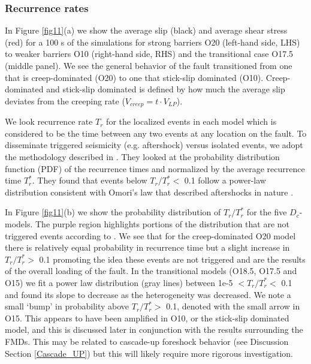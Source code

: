 \documentclass[preprint,1p, 10pt,authoryear]{elsarticle}
\begin{document}
\subsubsection{Recurrence rates}
\label{Recurrence times}
In Figure \ref{fig11}(a) we show the average slip (black) and average shear stress (red) for a 100 s of the simulations for strong barriers O20 (left-hand side, LHS) to weaker barriers O10 (right-hand side, RHS) and the transitional case O17.5 (middle panel).  We see the general behavior of the fault transitioned from one that is creep-dominated (O20) to one that stick-slip dominated (O10). Creep-dominated and stick-slip dominated is defined by how much the average slip deviates from the creeping rate ($V_{creep} = t\cdot V_{LP}$). 

We look recurrence rate $T_{r}$ for the localized events in each model which is considered to be the time between any two events at any location on the fault. To disseminate triggered  seismicity (e.g. aftershock) versus isolated events, we adopt the methodology described in \citet{Lengline2009}. They looked at the probability distribution function (PDF) of the recurrence times and normalized by the average recurrence time $T^{*}_{r}$.  They found that events below $T_{r}/T^{*}_{r} <$ 0.1 follow a power-law distribution consistent with Omori's law that described aftershocks in nature \citep[e.g.,][]{Lengline2009}. 

In Figure \ref{fig11}(b) we show the probability distribution of $T_{r}/T^{*}_{r}$ for the five $D_{c}$-models. The purple region highlights portions of the distribution that are not triggered events according to \citet{Lengline2009}. We see that for the creep-dominated O20 model there is relatively equal probability in recurrence time but a slight increase in  $T_{r}/T^{*}_{r} >$ 0.1 promoting the idea these events are not triggered and are the results of the overall loading of the fault. In the transitional models (O18.5, O17.5 and O15) we fit a power law distribution (gray lines) between 1e-5 $< T_{r}/T^{*}_{r} <$ 0.1 and found its slope to decrease as the heterogeneity was decreased. We note a small `bump' in probability above $T_{r}/T^{*}_{r} >$ 0.1, denoted with the small arrow in O15. This appears to have been amplified in O10, or the stick-slip dominated model, and this is discussed later in conjunction with the results surrounding the FMDs.  This may be related to cascade-up foreshock behavior (see Discussion Section \ref{Cascade_UP}) but this will likely require more rigorous investigation.
\end{document}

